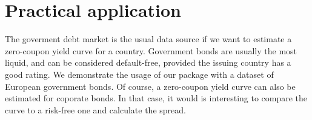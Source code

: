 \newpage
\section{Practical application}
\label{sec:pract-appl}

The goverment debt market is the usual data source if we want to estimate a zero-coupon yield curve for a country. Government bonds are usually the most liquid, and can be considered default-free, provided the issuing country has a good rating. We demonstrate the usage of our package with a dataset of European government bonds. Of course, a zero-coupon yield curve can also be estimated for coporate bonds. In that case, it would is interesting to compare the curve to a risk-free one and calculate the spread.








